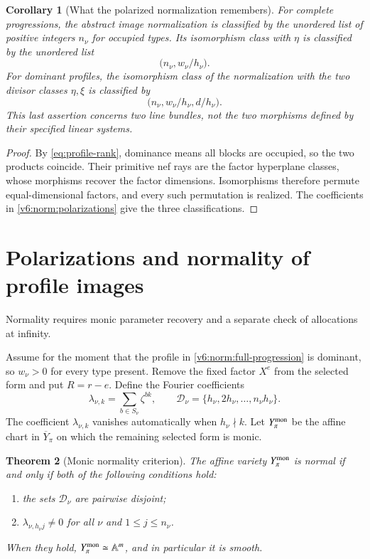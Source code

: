 \documentclass[10pt,fleqn]{article}
\numberwithin{equation}{section}
\newtheorem{theorem}{Theorem}[section]
\newtheorem{corollary}[theorem]{Corollary}
\newcommand{\A}{\mathbb A}
\begin{document}
\begin{corollary}[What the polarized normalization remembers]
\label{v6:norm:polarized-classification}
For complete progressions, the abstract image normalization is
classified by the unordered list of positive integers $n_\nu$ for
occupied types.  Its isomorphism class with $\eta$ is classified by
the unordered list
\[
 \bigl(n_\nu,w_\nu/h_\nu\bigr).
\]
For dominant profiles, the isomorphism class of the normalization
with the two divisor classes $\eta,\xi$ is classified by
\[
 \bigl(n_\nu,w_\nu/h_\nu,d/h_\nu\bigr).
\]
This last assertion concerns two line bundles, not the two
morphisms defined by their specified linear systems.
\end{corollary}

\begin{proof}
By \eqref{eq:profile-rank}, dominance means all blocks are occupied,
so the two products coincide.  Their primitive nef rays are the factor
hyperplane classes, whose morphisms recover the factor dimensions.
Isomorphisms therefore permute equal-dimensional factors, and every
such permutation is realized.  The coefficients in
\eqref{v6:norm:polarizations} give the three classifications.
\end{proof}

\section{Polarizations and normality of profile images}\label{sec:normality-new}

Normality requires monic parameter recovery and a separate check of
allocations at infinity.

Assume for the moment that the profile in
\eqref{v6:norm:full-progression} is dominant, so $w_\nu>0$ for every
type present.  Remove the fixed factor $X^e$ from the selected form
and put $R=r-e$.  Define the Fourier coefficients
\begin{equation}\label{v6:norm:fourier}
 \lambda_{\nu,k}=\sum_{b\in S_\nu}\zeta^{bk},
 \qquad
 \mathcal D_\nu=\{h_\nu,2h_\nu,\ldots,n_\nu h_\nu\}.
\end{equation}
The coefficient $\lambda_{\nu,k}$ vanishes automatically when
$h_\nu\nmid k$.  Let $Y_\pi^{\rm mon}$ be the affine chart in
$\overline Y_\pi$ on which the remaining selected form is monic.

\begin{theorem}[Monic normality criterion]
\label{v6:norm:affine-criterion}
The affine variety $Y_\pi^{\rm mon}$ is normal if and only if both
of the following conditions hold:
\begin{enumerate}[label=\textup{(\Alph*)},leftmargin=*]
\item the sets $\mathcal D_\nu$ are pairwise disjoint;
\item $\lambda_{\nu,h_\nu j}\ne0$ for all $\nu$ and
      $1\le j\le n_\nu$.
\end{enumerate}
When they hold, $Y_\pi^{\rm mon}\simeq\A^m$, and in particular it
is smooth.
\end{theorem}
\end{document}
